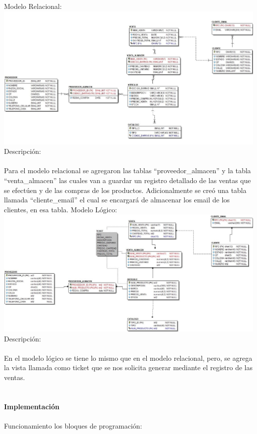 \documentclass[letter,12pt]{article} %
\begin{document}
Modelo Relacional:
\\
\includegraphics[scale=0.43]{imagenes/MR01.jpg}
\\
Descripción:
\\\\
Para el modelo relacional se agregaron las tablas “proveedor\_almacen” y la tabla “venta\_almacen” las cuales van a guardar un registro detallado de las ventas que se efectúen y de las compras de los productos. Adicionalmente se creó una tabla llamada “cliente\_email” el cual se encargará de almacenar los email de los clientes, en esa tabla.
\newpage
Modelo Lógico:
\\
\includegraphics[scale=0.43]{imagenes/MR02.jpg}
\\
Descripción:
\\\\
En el modelo lógico se tiene lo mismo que en el modelo relacional, pero, se agrega la vista llamada como ticket que se nos solicita generar mediante el registro de las ventas.
\\\\\\
\large{ \textbf{Implementaci\'on}}
\\\\
Funcionamiento los bloques de programación:
\end{document}
